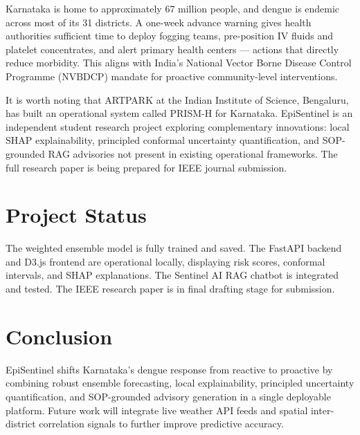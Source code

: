 \documentclass[11pt,a4paper]{article}
\begin{document}
Karnataka is home to approximately 67 million people, and dengue is endemic across most of its 31 districts. A one-week advance warning gives health authorities sufficient time to deploy fogging teams, pre-position IV fluids and platelet concentrates, and alert primary health centers --- actions that directly reduce morbidity. This aligns with India's National Vector Borne Disease Control Programme (NVBDCP) mandate for proactive community-level interventions.

It is worth noting that ARTPARK at the Indian Institute of Science, Bengaluru, has built an operational system called PRISM-H for Karnataka. EpiSentinel is an independent student research project exploring complementary innovations: local SHAP explainability, principled conformal uncertainty quantification, and SOP-grounded RAG advisories not present in existing operational frameworks. The full research paper is being prepared for IEEE journal submission.

\section{Project Status}
\label{sec:status}

The weighted ensemble model is fully trained and saved. The FastAPI backend and D3.js frontend are operational locally, displaying risk scores, conformal intervals, and SHAP explanations. The Sentinel AI RAG chatbot is integrated and tested. The IEEE research paper is in final drafting stage for submission.

\section{Conclusion}
\label{sec:conclusion}

EpiSentinel shifts Karnataka's dengue response from reactive to proactive by combining robust ensemble forecasting, local explainability, principled uncertainty quantification, and SOP-grounded advisory generation in a single deployable platform. Future work will integrate live weather API feeds and spatial inter-district correlation signals to further improve predictive accuracy.
\end{document}
